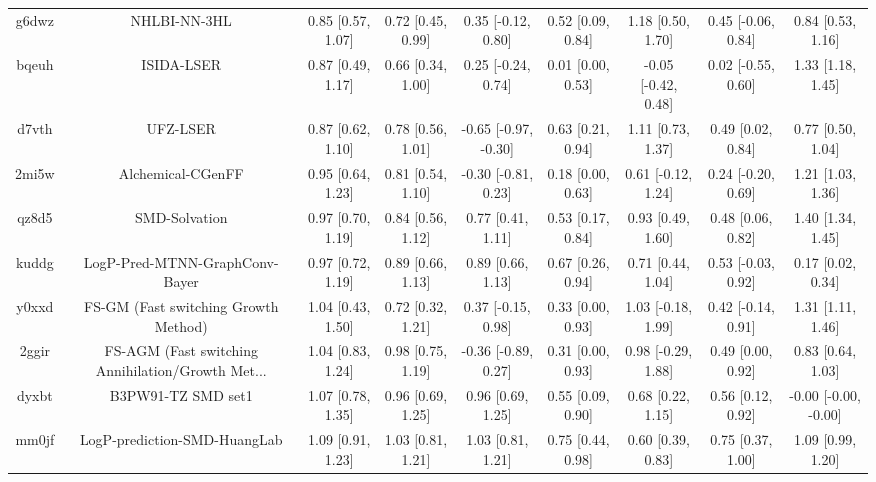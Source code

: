 \documentclass{article}
\begin{document}
\begin{center}
\begin{longtable}{|ccccccccc|}
 g6dwz &                                       NHLBI-NN-3HL &  0.85 [0.57, 1.07] &  0.72 [0.45, 0.99] &    0.35 [-0.12, 0.80] &  0.52 [0.09, 0.84] &    1.18 [0.50, 1.70] &   0.45 [-0.06, 0.84] &     0.84 [0.53, 1.16] \\
 bqeuh &                                         ISIDA-LSER &  0.87 [0.49, 1.17] &  0.66 [0.34, 1.00] &    0.25 [-0.24, 0.74] &  0.01 [0.00, 0.53] &  -0.05 [-0.42, 0.48] &   0.02 [-0.55, 0.60] &     1.33 [1.18, 1.45] \\
 d7vth &                                           UFZ-LSER &  0.87 [0.62, 1.10] &  0.78 [0.56, 1.01] &  -0.65 [-0.97, -0.30] &  0.63 [0.21, 0.94] &    1.11 [0.73, 1.37] &    0.49 [0.02, 0.84] &     0.77 [0.50, 1.04] \\
 2mi5w &                                  Alchemical-CGenFF &  0.95 [0.64, 1.23] &  0.81 [0.54, 1.10] &   -0.30 [-0.81, 0.23] &  0.18 [0.00, 0.63] &   0.61 [-0.12, 1.24] &   0.24 [-0.20, 0.69] &     1.21 [1.03, 1.36] \\
 qz8d5 &                                      SMD-Solvation &  0.97 [0.70, 1.19] &  0.84 [0.56, 1.12] &     0.77 [0.41, 1.11] &  0.53 [0.17, 0.84] &    0.93 [0.49, 1.60] &    0.48 [0.06, 0.82] &     1.40 [1.34, 1.45] \\
 kuddg &                     LogP-Pred-MTNN-GraphConv-Bayer &  0.97 [0.72, 1.19] &  0.89 [0.66, 1.13] &     0.89 [0.66, 1.13] &  0.67 [0.26, 0.94] &    0.71 [0.44, 1.04] &   0.53 [-0.03, 0.92] &     0.17 [0.02, 0.34] \\
 y0xxd &               FS-GM (Fast switching Growth Method) &  1.04 [0.43, 1.50] &  0.72 [0.32, 1.21] &    0.37 [-0.15, 0.98] &  0.33 [0.00, 0.93] &   1.03 [-0.18, 1.99] &   0.42 [-0.14, 0.91] &     1.31 [1.11, 1.46] \\
 2ggir &  FS-AGM (Fast switching Annihilation/Growth Met... &  1.04 [0.83, 1.24] &  0.98 [0.75, 1.19] &   -0.36 [-0.89, 0.27] &  0.31 [0.00, 0.93] &   0.98 [-0.29, 1.88] &    0.49 [0.00, 0.92] &     0.83 [0.64, 1.03] \\
 dyxbt &                                 B3PW91-TZ SMD set1 &  1.07 [0.78, 1.35] &  0.96 [0.69, 1.25] &     0.96 [0.69, 1.25] &  0.55 [0.09, 0.90] &    0.68 [0.22, 1.15] &    0.56 [0.12, 0.92] &  -0.00 [-0.00, -0.00] \\
 mm0jf &                       LogP-prediction-SMD-HuangLab &  1.09 [0.91, 1.23] &  1.03 [0.81, 1.21] &     1.03 [0.81, 1.21] &  0.75 [0.44, 0.98] &    0.60 [0.39, 0.83] &    0.75 [0.37, 1.00] &     1.09 [0.99, 1.20] \\

\end{longtable}
\end{center}
\end{document}
